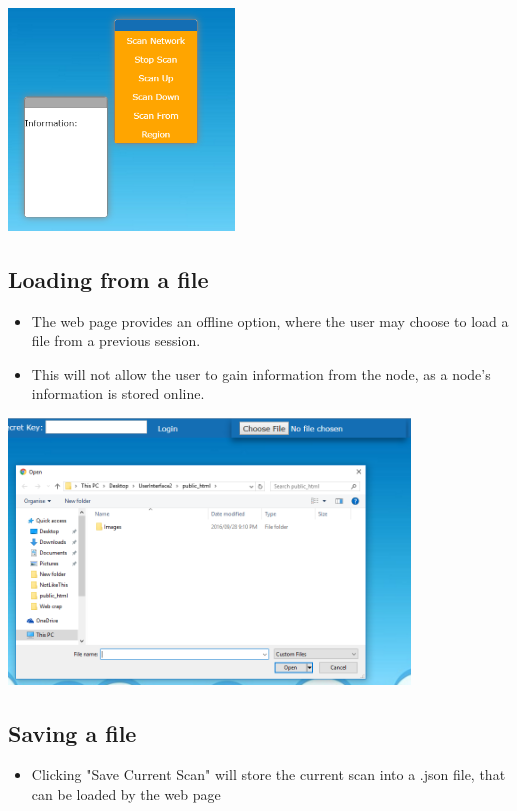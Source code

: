 \documentclass[hidelinks,a4paper,12pt]{article}
\begin{document}
			\begin{center}
				\includegraphics[width=0.45\textwidth]{./images/DragBoxes.png}
				
			\end{center}
			\newpage	
			
			\subsection{Loading from a file}
					\begin {itemize}
					\item The web page provides an offline option, where the user may choose to load a file from a previous session. 
					\item This will not allow the user to gain information from the node, as a node's information is stored online.
				\end{itemize}
				
				\begin{center}
					\includegraphics[width=0.8\textwidth]{./images/OpenFile.png}
				\end{center}
			
				
				\subsection{Saving a file}
				\begin {itemize}
				\item Clicking "Save Current Scan" will store the current scan into a .json file, that can be loaded by the web page 
			\end{itemize}
			
\end{document}

